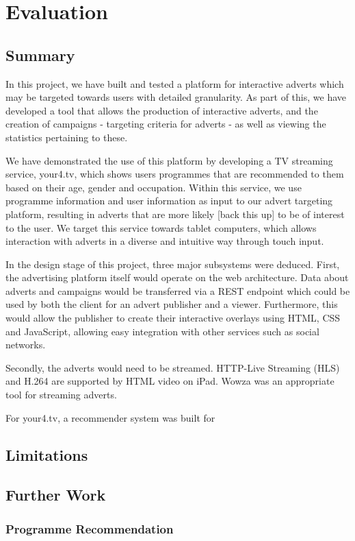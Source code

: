 \section{Evaluation}
	\subsection{Summary}
		In this project, we have built and tested a platform for interactive adverts which may be targeted towards users with detailed granularity. As part of this, we have developed a tool that allows the production of interactive adverts, and the creation of campaigns - targeting criteria for adverts - as well as viewing the statistics pertaining to these.

		We have demonstrated the use of this platform by developing a TV streaming service, your4.tv, which shows users programmes that are recommended to them based on their age, gender and occupation. Within this service, we use programme information and user information as input to our advert targeting platform, resulting in adverts that are more likely [back this up] to be of interest to the user. We target this service towards tablet computers, which allows interaction with adverts in a diverse and intuitive way through touch input.

		In the design stage of this project, three major subsystems were deduced. First, the advertising platform itself would operate on the web architecture. Data about adverts and campaigns would be transferred via a REST endpoint which could be used by both the client for an advert publisher and a viewer. Furthermore, this would allow the publisher to create their interactive overlays using HTML, CSS and JavaScript, allowing easy integration with other services such as social networks.

		Secondly, the adverts would need to be streamed. HTTP-Live Streaming (HLS) and H.264 are supported by HTML video on iPad. Wowza was an appropriate tool for streaming adverts.

		For your4.tv, a recommender system was built for 
	\subsection{Limitations}
	\subsection{Further Work}
		\subsubsection{Programme Recommendation}
		\label{sec:further_work_recommender}

